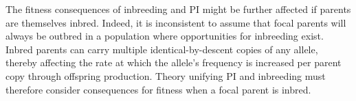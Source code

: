 \documentclass[12pt]{article}
\begin{document}
The fitness consequences of inbreeding and PI might be further affected if parents are themselves inbred. Indeed, it is inconsistent to assume that focal parents will always be outbred in a population where opportunities for inbreeding exist. Inbred parents can carry multiple identical-by-descent copies of any allele, thereby affecting the rate at which the allele's frequency is increased per parent copy through offspring production. Theory unifying PI and inbreeding must therefore consider consequences for fitness when a focal parent is inbred.
\end{document}
